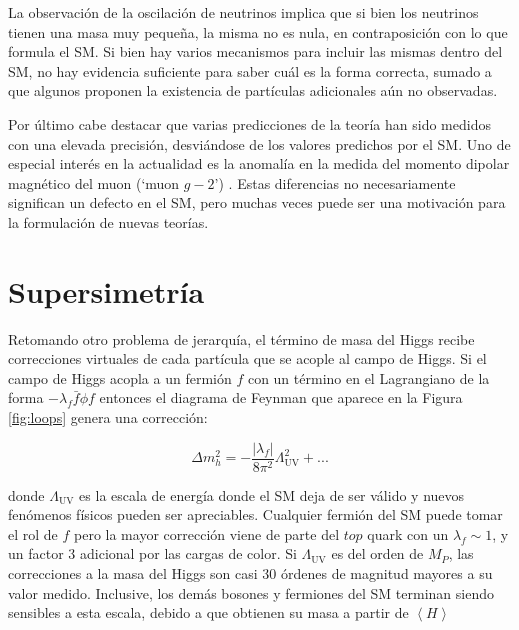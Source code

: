 La observación de la oscilación de neutrinos implica que si bien los neutrinos tienen una masa muy pequeña, la misma no es nula, en contraposición con lo que formula el SM. Si bien hay varios mecanismos para incluir las mismas dentro del SM, no hay evidencia suficiente para saber cuál es la forma correcta, 
sumado a que algunos proponen la existencia de partículas adicionales aún no observadas.

Por último cabe destacar que varias predicciones de la teoría han sido medidos con una elevada precisión, desviándose de los valores predichos por el SM. Uno de especial interés en la actualidad es la anomalía en la medida del momento dipolar magnético del muon (`muon $g-2$') \cite{PhysRevLett.126.141801}. Estas diferencias no necesariamente significan un defecto en el SM, pero muchas veces puede ser una motivación para la formulación de nuevas teorías.

\section{Supersimetría}\label{sec:susy}

Retomando otro problema de jerarquía, el término de masa del Higgs recibe correcciones virtuales de cada partícula que se acople al campo de Higgs. 
Si el campo de Higgs acopla a un fermión $f$ con un término en el Lagrangiano de la forma $-\lambda_f \bar{f} \phi f$ entonces el diagrama de Feynman que aparece en la Figura \ref{fig:loops} genera una corrección:


\begin{equation}
	\Delta m_h^2 = - \frac{|\lambda_f|}{8 \pi^2}\Lambda_{\text{UV}}^2 + ...
\end{equation}

\noindent
donde $\Lambda_{\text{UV}}$ es la escala de energía donde el SM deja de ser válido y nuevos fenómenos físicos pueden ser apreciables. Cualquier fermión del SM puede tomar el rol de $f$ pero la mayor corrección viene de parte del $top$ quark con un $\lambda_f\sim1$, y un factor 3 adicional por las cargas de color. Si $\Lambda_{\text{UV}}$ es del orden de $M_P$, las correcciones a la masa del Higgs son casi 30 órdenes de magnitud mayores a su valor medido. 
Inclusive, los demás bosones y fermiones del SM terminan siendo sensibles a esta escala, debido a que obtienen su masa a partir de $\left<H\right>$

